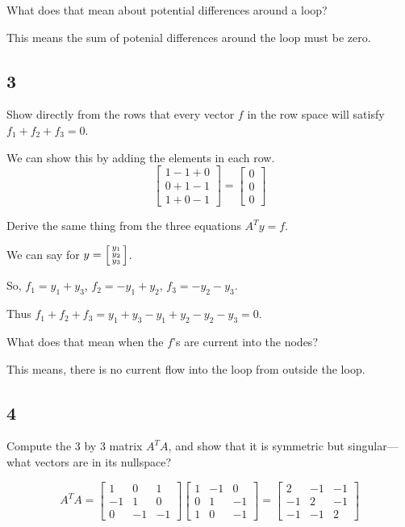 \documentclass[12pt,letterpaper]{article}
\begin{document}
      What does that mean about potential differences around a loop?

      This means the sum of potenial differences around the loop must be zero.

    \subsection*{3}
      Show directly from the rows that every vector $f$ in the row space will satisfy $f_1 + f_2 + f_3 = 0$.

      We can show this by adding the elements in each row.
      \[
        \begin{bmatrix}
          1 - 1 + 0 \\
          0 + 1 - 1 \\
          1 + 0 - 1
        \end{bmatrix}
        =
        \begin{bmatrix}
          0 \\
          0 \\
          0
        \end{bmatrix}
      \]

      Derive the same thing from the three equations $A^Ty = f$.

      We can say for $y = \begin{bsmallmatrix}y_1 \\ y_2 \\ y_3\end{bsmallmatrix}$.

      So, $f_1 = y_1 + y_3$, $f_2 = -y_1 + y_2$, $f_3 = -y_2 - y_3$.

      Thus $f_1 + f_2 + f_3 = y_1 + y_3 - y_1 + y_2 - y_2 - y_3 = 0$.

      What does that mean when the $f$'s are current into the nodes?

      This means, there is no current flow into the loop from outside the loop.
    \subsection*{4}
      Compute the 3 by 3 matrix $A^TA$, and show that it is symmetric but singular---what vectors are in its nullspace?

      \[
        A^TA =
        \begin{bmatrix}
          1 & 0 & 1 \\
          -1 & 1 & 0 \\
          0 & -1 & -1
        \end{bmatrix}
        \begin{bmatrix}
          1 & -1 & 0 \\
          0 & 1 & -1 \\
          1 & 0 & -1
        \end{bmatrix}
        =
        \begin{bmatrix}
          2 & -1 & -1 \\
          -1 & 2 & -1 \\
          -1 & -1 & 2
        \end{bmatrix}
      \]
\end{document}
